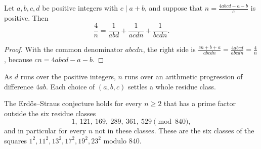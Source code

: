 \begin{lemma}\label{lem:typeI}
Let $a,b,c,d$ be positive integers with $c\mid a+b$, and suppose that $n=\frac{4abcd-a-b}c$ is positive. Then
\[
\frac4n=\frac1{abd}+\frac1{acdn}+\frac1{bcdn}.
\]
\end{lemma}
\begin{proof}
With the common denominator $abcdn$, the right side is $\frac{cn+b+a}{abcdn}=\frac{4abcd}{abcdn}=\frac4n$, because $cn=4abcd-a-b$.
\end{proof}

As $d$ runs over the positive integers, $n$ runs over an arithmetic progression of difference $4ab$. Each choice of $(a,b,c)$ settles a whole residue
class.

\begin{theorem}[Mordell]\label{thm:mordell}
The Erd\H os--Straus conjecture holds for every $n\ge2$ that has a prime factor outside the six residue classes
\[
1,\ 121,\ 169,\ 289,\ 361,\ 529\pmod{840},
\]
and in particular for every $n$ not in these classes. These are the six classes of the squares $1^2,11^2,13^2,17^2,19^2,23^2$ modulo $840$.
\end{theorem}
